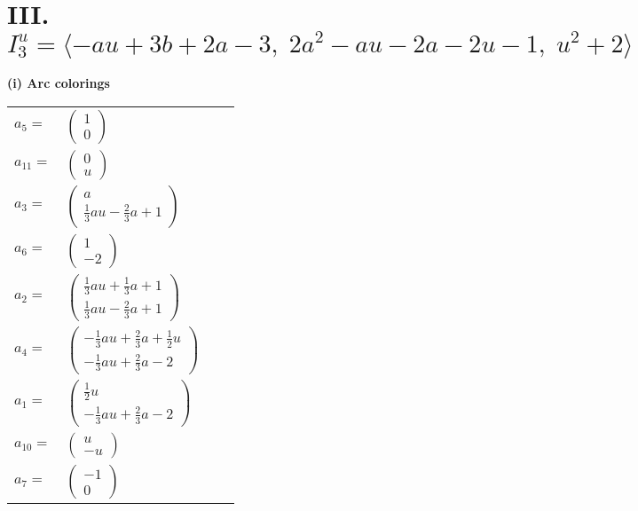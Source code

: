 \documentclass[1p]{elsarticle_modified}
\theoremstyle{definition}
\begin{document}
\centering \section*{III. $I^u_{3}= \langle - a u+3 b+2 a-3,\;2 a^2- a u-2 a-2 u-1,\;u^2+2 \rangle$}
\flushleft \textbf{(i) Arc colorings}\\
\begin{tabular}{m{7pt} m{180pt} m{7pt} m{180pt} }
\flushright $a_{5}=$&$\begin{pmatrix}1\\0\end{pmatrix}$ \\
\flushright $a_{11}=$&$\begin{pmatrix}0\\u\end{pmatrix}$ \\
\flushright $a_{3}=$&$\begin{pmatrix}a\\\frac{1}{3} a u-\frac{2}{3} a+1\end{pmatrix}$ \\
\flushright $a_{6}=$&$\begin{pmatrix}1\\-2\end{pmatrix}$ \\
\flushright $a_{2}=$&$\begin{pmatrix}\frac{1}{3} a u+\frac{1}{3} a+1\\\frac{1}{3} a u-\frac{2}{3} a+1\end{pmatrix}$ \\
\flushright $a_{4}=$&$\begin{pmatrix}-\frac{1}{3} a u+\frac{2}{3} a+\frac{1}{2} u\\-\frac{1}{3} a u+\frac{2}{3} a-2\end{pmatrix}$ \\
\flushright $a_{1}=$&$\begin{pmatrix}\frac{1}{2} u\\-\frac{1}{3} a u+\frac{2}{3} a-2\end{pmatrix}$ \\
\flushright $a_{10}=$&$\begin{pmatrix}u\\- u\end{pmatrix}$ \\
\flushright $a_{7}=$&$\begin{pmatrix}-1\\0\end{pmatrix}$ \\

\end{tabular}
\end{document}
